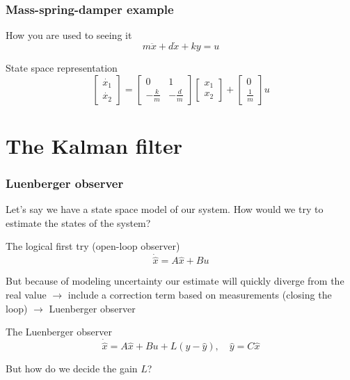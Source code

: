 \documentclass{beamer}
\begin{document}
\begin{frame}
    \frametitle{Mass-spring-damper example}

    \begin{block}{How you are used to seeing it}
        \begin{equation}
            m \ddot{x}+d \dot{x} + ky=u
        \end{equation}
    \end{block}

    \begin{block}{State space representation}
        \begin{equation}
        \left[\begin{array}{c}{{\dot{x_1}}} \\ {\dot{x_2}}\end{array}\right] =\left[\begin{array}{cc}{0} & {1} \\ {-\frac{k}{m}} & {-\frac{d}{m}}\end{array}\right] \left[\begin{array}{c}{{x_1}} \\ {x_2}\end{array}\right] +\left[\begin{array}{c}{0} \\ {\frac{1}{m}}\end{array}\right] u
        \end{equation}
    \end{block}
\end{frame}


\section{The Kalman filter}

\begin{frame}
    \frametitle{Luenberger observer}
    Let's say we have a state space model of our system. How would we try to estimate the states of the system? 

    \begin{block}{The logical first try (open-loop observer)}
        \begin{equation}
            \dot{\hat{x}} = A \hat{x} + B u 
        \end{equation}
    \end{block}

    But because of modeling uncertainty our estimate will quickly diverge from the real value $\rightarrow$ include a correction term based on measurements (closing the loop) $\rightarrow$ Luenberger observer

    \begin{block}{The Luenberger observer}
        \begin{equation}
            \dot{\hat{x}} = A \hat{x} + B u + L (y - \hat{y}), \quad \hat{y} = C \hat{x}
        \end{equation}
    \end{block}
    But how do we decide the gain $L$?
\end{frame}
\end{document}
